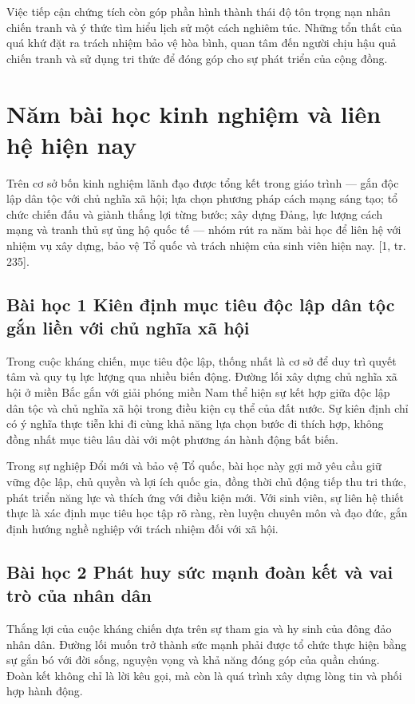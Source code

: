 Việc tiếp cận chứng tích còn góp phần hình thành thái độ tôn trọng nạn nhân chiến tranh và ý thức tìm hiểu lịch sử một cách nghiêm túc. Những tổn thất của quá khứ đặt ra trách nhiệm bảo vệ hòa bình, quan tâm đến người chịu hậu quả chiến tranh và sử dụng tri thức để đóng góp cho sự phát triển của cộng đồng.

\section{Năm bài học kinh nghiệm và liên hệ hiện nay}

Trên cơ sở bốn kinh nghiệm lãnh đạo được tổng kết trong giáo trình — gắn độc lập dân tộc với chủ nghĩa xã hội; lựa chọn phương pháp cách mạng sáng tạo; tổ chức chiến đấu và giành thắng lợi từng bước; xây dựng Đảng, lực lượng cách mạng và tranh thủ sự ủng hộ quốc tế — nhóm rút ra năm bài học để liên hệ với nhiệm vụ xây dựng, bảo vệ Tổ quốc và trách nhiệm của sinh viên hiện nay. [1, tr. 235].

\subsection{Bài học 1 Kiên định mục tiêu độc lập dân tộc gắn liền với chủ nghĩa xã hội}

Trong cuộc kháng chiến, mục tiêu độc lập, thống nhất là cơ sở để duy trì quyết tâm và quy tụ lực lượng qua nhiều biến động. Đường lối xây dựng chủ nghĩa xã hội ở miền Bắc gắn với giải phóng miền Nam thể hiện sự kết hợp giữa độc lập dân tộc và chủ nghĩa xã hội trong điều kiện cụ thể của đất nước. Sự kiên định chỉ có ý nghĩa thực tiễn khi đi cùng khả năng lựa chọn bước đi thích hợp, không đồng nhất mục tiêu lâu dài với một phương án hành động bất biến.

Trong sự nghiệp Đổi mới và bảo vệ Tổ quốc, bài học này gợi mở yêu cầu giữ vững độc lập, chủ quyền và lợi ích quốc gia, đồng thời chủ động tiếp thu tri thức, phát triển năng lực và thích ứng với điều kiện mới. Với sinh viên, sự liên hệ thiết thực là xác định mục tiêu học tập rõ ràng, rèn luyện chuyên môn và đạo đức, gắn định hướng nghề nghiệp với trách nhiệm đối với xã hội.

\subsection{Bài học 2 Phát huy sức mạnh đoàn kết và vai trò của nhân dân}

Thắng lợi của cuộc kháng chiến dựa trên sự tham gia và hy sinh của đông đảo nhân dân. Đường lối muốn trở thành sức mạnh phải được tổ chức thực hiện bằng sự gắn bó với đời sống, nguyện vọng và khả năng đóng góp của quần chúng. Đoàn kết không chỉ là lời kêu gọi, mà còn là quá trình xây dựng lòng tin và phối hợp hành động.

